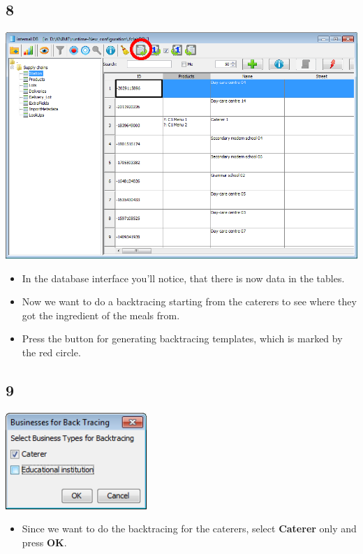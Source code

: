 \documentclass{beamer}
\begin{document}
\subsection{8}
\begin{frame}
	\begin{center}
  		\includegraphics[height=0.5\textheight]{8.png}
	\end{center}
	\begin{itemize}
		\item In the database interface you'll notice, that there is now data in the tables.
		\item Now we want to do a backtracing starting from the caterers to see where they got the ingredient of the meals from.
		\item Press the button for generating backtracing templates, which is marked by the red circle.
	\end{itemize}
\end{frame}

\subsection{9}
\begin{frame}
	\begin{center}
  		\includegraphics[width=0.4\textwidth]{9.png}
	\end{center}
	\begin{itemize}
		\item Since we want to do the backtracing for the caterers, select \textbf{Caterer} only and press \textbf{OK}.
	\end{itemize}
\end{frame}
\end{document}
